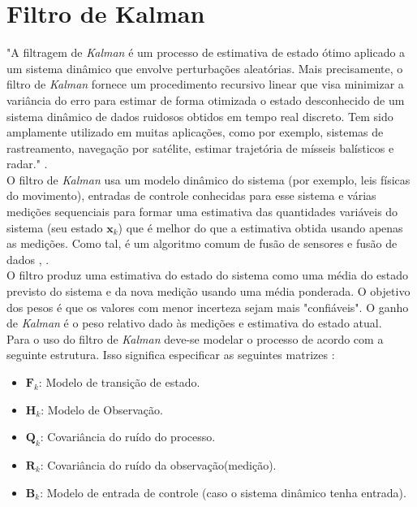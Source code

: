 \section{Filtro de Kalman}
\label{sec:kalman}
"A filtragem de \emph{Kalman} é um processo de estimativa de estado ótimo aplicado a um sistema dinâmico que envolve perturbações aleatórias. Mais precisamente, o filtro de \emph{Kalman} fornece um  procedimento recursivo linear que visa minimizar a variância do erro para estimar de forma otimizada o estado desconhecido de um sistema dinâmico de dados ruidosos obtidos em tempo real discreto. Tem sido amplamente utilizado em muitas aplicações, como por exemplo, sistemas de rastreamento, navegação por satélite, estimar trajetória de mísseis balísticos e radar." \cite{kalman:book}.\\

O filtro de \emph{Kalman} usa um modelo dinâmico do sistema (por exemplo, leis físicas do movimento), entradas de controle conhecidas para esse sistema e várias medições sequenciais para formar uma estimativa das quantidades variáveis do sistema (seu estado $\textbf{x}_k$) que é melhor do que a estimativa obtida usando apenas as medições. Como tal, é um algoritmo comum de fusão de sensores e fusão de dados \cite{kalman:wiki}, \cite{Kalman:ofid}.\\

O filtro produz uma estimativa do estado do sistema como uma média do estado previsto do sistema e da nova medição usando uma média ponderada. O objetivo dos pesos é que os valores com menor incerteza sejam mais "confiáveis". O ganho de \emph{Kalman} é o peso relativo dado às medições e estimativa do estado atual.\\

Para o uso do filtro de \emph{Kalman} deve-se modelar o processo de acordo com a seguinte estrutura. Isso significa especificar as seguintes matrizes \cite{kalman:book}:

\begin{itemize}
    \item $\textbf{F}_k$: Modelo de transição de estado.
    \item $\textbf{H}_k$: Modelo de Observação.
    \item $\textbf{Q}_k$: Covariância do ruído do processo.
    \item $\textbf{R}_k$: Covariância do ruído da observação(medição).
    \item $\textbf{B}_k$: Modelo de entrada de controle (caso o sistema dinâmico tenha entrada). 
\end{itemize}


